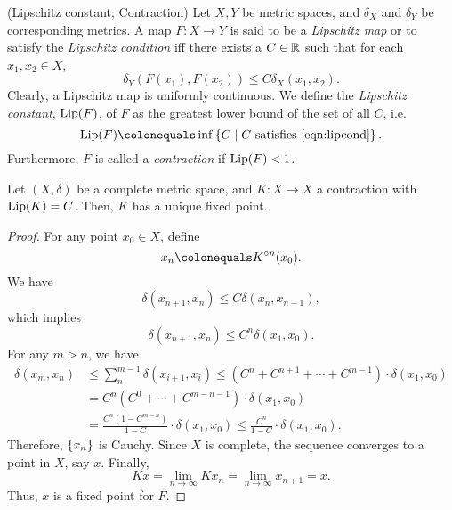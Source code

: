 \documentclass[12pt,twoside,draft]{book}
\begin{document}
\begin{definition}
  (Lipschitz constant; Contraction)
  Let $X, Y$ be metric spaces, and $\delta_X$ and $\delta_Y$ be corresponding metrics.
  A map $F: X \to Y$ is said to be a \textit{Lipschitz map} or to satisfy the \textit{Lipschitz condition} iff there exists a $C \in \mathbb{R}$ such that for each $x_1, x_2 \in X$,
  \begin{equation}
    \delta_Y(F(x_1),F(x_2)) \leq C \delta_X(x_1, x_2). 
    \label{eqn:lipcond}
  \end{equation}
  Clearly, a Lipschitz map is uniformly continuous.
  We define the \textit{Lipschitz constant}, $\mathrm{Lip}(F)$, of $F$ as the greatest lower bound of the set of all $C$, i.e.
  \begin{equation*}
    \Lip(F) \ceq \inf\setst{C}{C \mbox{ satisfies } \eqref{eqn:lipcond}}.
  \end{equation*}
  Furthermore, $F$ is called a \textit{contraction} if $\mathrm{Lip}(F) < 1$.
\end{definition}

\begin{theorem}
  Let $(X,\delta)$ be a complete metric space, and $K: X \to X$ a contraction with $\mathrm{Lip}(K) = C$.
  Then, $K$ has a unique fixed point.
  \label{thm:cfp}
  \begin{proof}
    For any point $x_0 \in X$, define
    \begin{equation*}
      x_n \ceq \itr{K}{n}(x_0).
    \end{equation*}
    We have
    \begin{equation*}
      \delta(x_{n+1}, x_n) \leq C \delta(x_n, x_{n-1}),
    \end{equation*}
    which implies
    \begin{equation*}
      \delta(x_{n+1}, x_n) \leq C^n \delta(x_1, x_0).
    \end{equation*}
    For any $m > n$, we have
    \begin{align*}
      \delta(x_m, x_n) &\leq \sum\limits_n^{m-1} \delta(x_{i+1}, x_i) 
        \leq (C^n + C^{n+1} + \cdots + C^{m-1}) \cdot \delta(x_1, x_0) \\
        & = C^n (C^{0} + \cdots + C^{m-n-1} ) \cdot \delta(x_1, x_0) \\
        & = \frac{C^n(1 - C^{m-n})}{1-C} \cdot \delta(x_1, x_0)
        \leq \frac{C^n}{1-C} \cdot \delta(x_1, x_0).
    \end{align*}
    Therefore, $\left \{ x_n \right \}$ is Cauchy.
    Since $X$ is complete, the sequence converges to a point in $X$, say $x$.
    Finally, 
    \begin{equation*}
      Kx = \lim\limits_{n\to \infty} Kx_n = \lim\limits_{n\to \infty} x_{n+1} = x.
    \end{equation*}
    Thus, $x$ is a fixed point for $F$.
  \end{proof}
\end{theorem}
\end{document}
